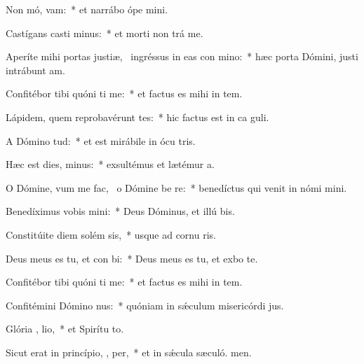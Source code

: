 \item Non mó,  vam:~* et narrábo ópe mini.
\item Castígans casti  minus:~* et morti non trá me.
\item Aperíte mihi portas justiæ,~\pscross{} ingréssus in eas con mino:~* hæc porta Dómini, justi intrábunt  am.
\item Confitébor tibi quóni ti me:~* et factus es mihi in tem.
\item Lápidem, quem reprobavérunt tes:~* hic factus est in ca guli.
\item A Dómino   tud:~* et est mirábile in ócu tris.
\item Hæc est dies,   minus:~* exsultémus et lætémur  a.
\item O Dómine, vum me fac,~\pscross{} o Dómine be re:~* benedíctus qui venit in nómi mini.
\item Benedíximus vobis   mini:~* Deus Dóminus, et illú bis.
\item Constitúite diem solém  sis,~* usque ad cornu ris.
\item Deus meus es tu, et con bi:~* Deus meus es tu, et exbo te.
\item Confitébor tibi quóni ti me:~* et factus es mihi in tem.
\item Confitémini Dómino  nus:~* quóniam in sǽculum misericórdi jus.
\item Glória ,  lio,~* et Spirítu to.
\item Sicut erat in princípio,  ,  per,~* et in sǽcula sæculó. men.
